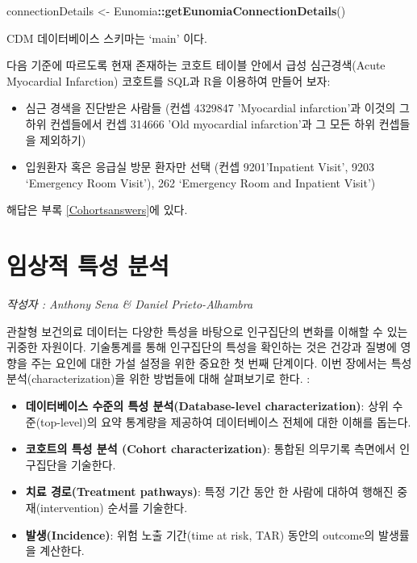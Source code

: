 \documentclass[11pt]{book}
\newenvironment{Shaded}{\begin{snugshade}}{\end{snugshade}}
\newcommand{\KeywordTok}[1]{\textcolor[rgb]{0.13,0.29,0.53}{\textbf{#1}}}
\newcommand{\StringTok}[1]{\textcolor[rgb]{0.31,0.60,0.02}{#1}}
\newcommand{\OperatorTok}[1]{\textcolor[rgb]{0.81,0.36,0.00}{\textbf{#1}}}
\newcommand{\NormalTok}[1]{#1}
\providecommand{\tightlist}{%
  \setlength{\itemsep}{0pt}\setlength{\parskip}{0pt}}
\theoremstyle{definition}
\theoremstyle{definition}
\theoremstyle{definition}
\theoremstyle{remark}
\let\BeginKnitrBlock\begin \let\EndKnitrBlock\end
\begin{document}
\begin{Shaded}
\begin{Highlighting}[]
\NormalTok{connectionDetails <-}\StringTok{ }\NormalTok{Eunomia}\OperatorTok{::}\KeywordTok{getEunomiaConnectionDetails}\NormalTok{()}
\end{Highlighting}
\end{Shaded}

CDM 데이터베이스 스키마는 `main' 이다.

\BeginKnitrBlock{exercise}
\protect\hypertarget{exr:exerciseCohortsSql}{}{\label{exr:exerciseCohortsSql}
}다음 기준에 따르도록 현재 존재하는 코호트 테이블 안에서 급성
심근경색(Acute Myocardial Infarction) 코호트를 SQL과 R을 이용하여 만들어
보자:

\begin{itemize}
\tightlist
\item
  심근 경색을 진단받은 사람들 (컨셉 4329847 'Myocardial infarction'과
  이것의 그 하위 컨셉들에서 컨셉 314666 'Old myocardial infarction'과 그
  모든 하위 컨셉들을 제외하기)
\item
  입원환자 혹은 응급실 방문 환자만 선택 (컨셉 9201'Inpatient Visit',
  9203 `Emergency Room Visit'), 262 `Emergency Room and Inpatient
  Visit')
\end{itemize}
\EndKnitrBlock{exercise}

해답은 부록 \ref{Cohortsanswers}에 있다.

\chapter{임상적 특성 분석}\label{Characterization}

\emph{작성자 : Anthony Sena \& Daniel Prieto-Alhambra}

관찰형 보건의료 데이터는 다양한 특성을 바탕으로 인구집단의 변화를 이해할
수 있는 귀중한 자원이다. 기술통계를 통해 인구집단의 특성을 확인하는 것은
건강과 질병에 영향을 주는 요인에 대한 가설 설정을 위한 중요한 첫 번째
단계이다. 이번 장에서는 특성 분석(characterization)을 위한 방법들에 대해
살펴보기로 한다. :

\begin{itemize}
\tightlist
\item
  \textbf{데이터베이스 수준의 특성 분석(Database-level
  characterization)}: 상위 수준(top-level)의 요약 통계량을 제공하여
  데이터베이스 전체에 대한 이해를 돕는다.
\item
  \textbf{코호트의 특성 분석 (Cohort characterization)}: 통합된 의무기록
  측면에서 인구집단을 기술한다.
\item
  \textbf{치료 경로(Treatment pathways)}: 특정 기간 동안 한 사람에
  대하여 행해진 중재(intervention) 순서를 기술한다.
\item
  \textbf{발생(Incidence)}: 위험 노출 기간(time at risk, TAR) 동안의
  outcome의 발생률을 계산한다.
\end{itemize}
\end{document}
